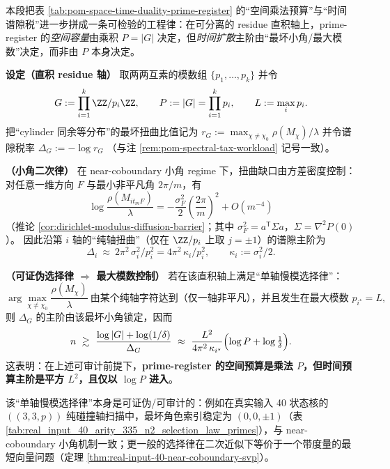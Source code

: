 \begin{remark}\label{rem:pom-max-modulus-control-law}
本段把表 \ref{tab:pom-space-time-duality-prime-register} 的“空间乘法预算”与“时间谱隙税”进一步拼成一条可检验的工程律：在可分离的 residue 直积轴上，prime-register 的\emph{空间容量}由乘积 \(P=|G|\) 决定，但\emph{时间扩散}主阶由“最坏小角/最大模数”决定，而非由 \(P\) 本身决定。
\par
\medskip\noindent\textbf{设定（直积 residue 轴）}
取两两互素的模数组 \(\{p_1,\dots,p_k\}\) 并令
\[
G:=\prod_{i=1}^k\ZZ/p_i\ZZ,
\qquad
P:=|G|=\prod_{i=1}^k p_i,
\qquad
L:=\max_i p_i.
\]
把“cylinder 同余等分布”的最坏扭曲比值记为
\(
r_G:=\max_{\chi\neq\chi_0}\rho(M_\chi)/\lambda
\)
并令谱隙税率
\(
\Delta_G:=-\log r_G
\)
（与注 \ref{rem:pom-spectral-tax-workload} 记号一致）。
\par
\medskip\noindent\textbf{（小角二次律）}
在 near-coboundary 小角 regime 下，扭曲缺口由方差密度控制：对任意一维方向 \(F\) 与最小非平凡角 \(2\pi/m\)，有
\[
\log\frac{\rho(M_{it_mF})}{\lambda}
=-\frac{\sigma_F^2}{2}\left(\frac{2\pi}{m}\right)^2+O(m^{-4})
\]
（推论 \ref{cor:dirichlet-modulus-diffusion-barrier}；其中 \(\sigma_F^2=a^{\mathsf T}\Sigma a\)，\(\Sigma=\nabla^2P(0)\)）。
因此沿第 \(i\) 轴的“纯轴扭曲”（仅在 \(\ZZ/p_i\) 上取 \(j=\pm1\)）的谱隙主阶为
\[
\Delta_i\ \approx\ 2\pi^2\,\sigma_i^2/p_i^2
=4\pi^2\,\kappa_i/p_i^2,
\qquad \kappa_i:=\sigma_i^2/2.
\]
\par
\medskip\noindent\textbf{（可证伪选择律 \(\Rightarrow\) 最大模数控制）}
若在该直积轴上满足“单轴慢模选择律”：
\[
\arg\max_{\chi\neq\chi_0}\frac{\rho(M_\chi)}{\lambda}
\ \text{由某个纯轴字符达到（仅一轴非平凡），并且发生在最大模数 }p_{i^\star}=L,
\]
则 \(\Delta_G\) 的主阶由该最坏小角锁定，因而
\[
n\ \gtrsim\ \frac{\log|G|+\log(1/\delta)}{\Delta_G}
\ \approx\
\frac{L^2}{4\pi^2\,\kappa_{i^\star}}\Bigl(\log P+\log\tfrac{1}{\delta}\Bigr).
\]
这表明：在上述可审计前提下，\textbf{prime-register 的空间预算是乘法 \(P\)，但时间预算主阶是平方 \(L^2\)，且仅以 \(\log P\) 进入}。
\par
该“单轴慢模选择律”本身是可证伪/可审计的：例如在真实输入 40 状态核的 \(((3,3,p))\) 纯碰撞轴扫描中，最坏角色索引稳定为 \((0,0,\pm1)\)（表 \ref{tab:real_input_40_arity_335_n2_selection_law_primes}），与 near-coboundary 小角机制一致；更一般的选择律在二次近似下等价于一个带度量的最短向量问题（定理 \ref{thm:real-input-40-near-coboundary-svp}）。
\end{remark}


